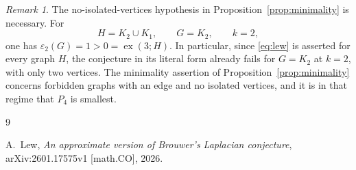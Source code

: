 \documentclass[11pt]{amsart}
\theoremstyle{remark}
\newtheorem{remark}[theorem]{Remark}
\newcommand{\eps}{\varepsilon}
\newcommand{\ex}{\operatorname{ex}}
\begin{document}
\begin{remark}
The no-isolated-vertices hypothesis in Proposition~\ref{prop:minimality} is
necessary. For
\[
H=K_2\cup K_1,\qquad G=K_2,\qquad k=2,
\]
one has $\eps_2(G)=1>0=\ex(3;H)$. In particular, since \eqref{eq:lew} is
asserted for every graph $H$, the conjecture in its literal form already fails
for $G=K_2$ at $k=2$, with only two vertices. The minimality assertion of
Proposition~\ref{prop:minimality} concerns forbidden graphs with an edge and
no isolated vertices, and it is in that regime that $P_4$ is smallest.
\end{remark}

\begin{thebibliography}{9}

A.~Lew,
\emph{An approximate version of Brouwer's Laplacian conjecture},
arXiv:2601.17575v1 [math.CO], 2026.

\end{thebibliography}
\end{document}
